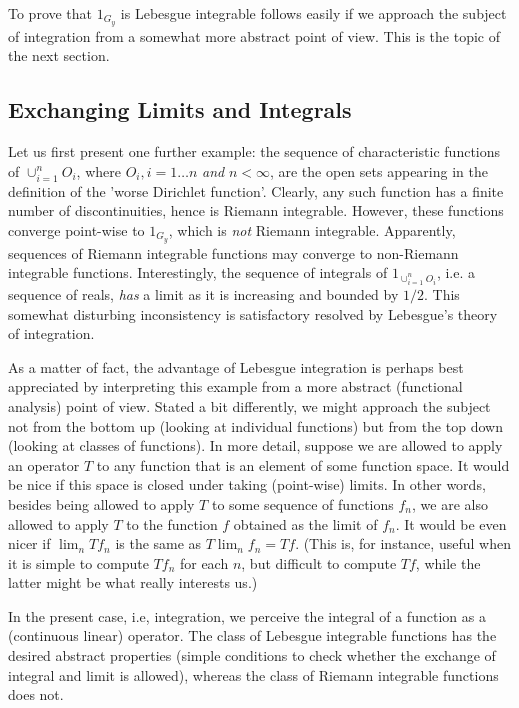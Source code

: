 \documentclass[12pt]{article}
\newcommand{\1}{{{\bf 1}}}
\begin{document}
To prove that $1_{G_y}$ is Lebesgue integrable follows
easily if we approach the subject of integration from a somewhat more
abstract point of view. This is the topic of the next section.

\subsection*{Exchanging Limits and Integrals}

Let us first present one further example: the sequence of
characteristic functions of $\cup_{i=1}^n O_i$, where $O_i, i=1\ldots
n$ \emph{and } $n<\infty$, are the open sets appearing in the
definition of the 'worse Dirichlet function'.  Clearly, any such
function has a finite number of discontinuities, hence is Riemann
integrable. However, these functions converge point-wise to
$1_{G_y}$, which is \emph{not} Riemann integrable.
Apparently, sequences of Riemann integrable functions may converge to
non-Riemann integrable functions.  Interestingly, the sequence of
integrals of $1_{\cup_{i=1}^n O_i}$, i.e. a sequence of
reals, \emph{has} a limit as it is increasing and bounded by $1/2$.
This somewhat disturbing inconsistency is satisfactory resolved
by Lebesgue's theory of integration.

As a matter of fact, the advantage of Lebesgue integration is perhaps
best appreciated by interpreting this example from a more abstract
(functional analysis) point of view.  Stated a bit differently, we
might approach the subject not from the bottom up (looking at
individual functions) but from the top down (looking at classes of
functions).  In more detail, suppose we are allowed to apply an
operator $T$ to any function that is an element of some function
space. It would be nice if this space is closed under taking
(point-wise) limits.  In other words, besides being allowed to apply
$T$ to some sequence of functions $f_n$, we are also allowed to apply
$T$ to the function $f$ obtained as the limit of $f_n$.  It would be
even nicer if  $\lim_n Tf_n$ is the same as $T \lim_n f_n = Tf$.
(This is, for instance, useful when it is simple to compute $T f_n$
for each $n$, but difficult to compute $Tf$, while the latter might be
what really interests us.)

In the present case, i.e, integration, we perceive the integral of a
function as a (continuous linear) operator.  The class of Lebesgue
integrable functions has the desired abstract properties (simple
conditions to check whether the exchange of integral and limit is
allowed), whereas the class of Riemann integrable functions does not.
\end{document}
